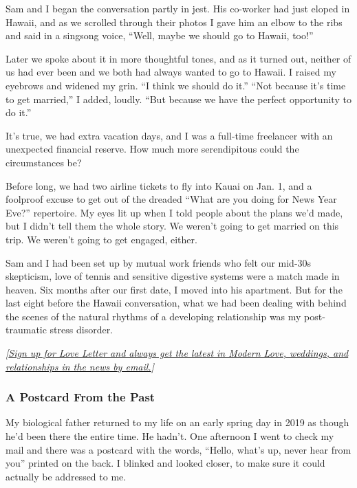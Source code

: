 Sam and I began the conversation partly in jest. His co-worker had just
eloped in Hawaii, and as we scrolled through their photos I gave him an
elbow to the ribs and said in a singsong voice, ``Well, maybe we should
go to Hawaii, too!''

Later we spoke about it in more thoughtful tones, and as it turned out,
neither of us had ever been and we both had always wanted to go to
Hawaii. I raised my eyebrows and widened my grin. ``I think we should do
it.'' ``Not because it's time to get married,'' I added, loudly. ``But
because we have the perfect opportunity to do it.''

It's true, we had extra vacation days, and I was a full-time freelancer
with an unexpected financial reserve. How much more serendipitous could
the circumstances be?

Before long, we had two airline tickets to fly into Kauai on Jan. 1, and
a foolproof excuse to get out of the dreaded ``What are you doing for
News Year Eve?'' repertoire. My eyes lit up when I told people about the
plans we'd made, but I didn't tell them the whole story. We weren't
going to get married on this trip. We weren't going to get engaged,
either.

Sam and I had been set up by mutual work friends who felt our mid-30s
skepticism, love of tennis and sensitive digestive systems were a match
made in heaven. Six months after our first date, I moved into his
apartment. But for the last eight before the Hawaii conversation, what
we had been dealing with behind the scenes of the natural rhythms of a
developing relationship was my post-traumatic stress disorder.

\emph{{[}}\href{https://www.nytimes.com/newsletters/love-letter?module=inline}{\emph{Sign
up for Love Letter and always get the latest in Modern Love, weddings,
and relationships in the news by email.}}\emph{{]}}

\hypertarget{a-postcard-from-the-past}{%
\subsubsection{A Postcard From the
Past}\label{a-postcard-from-the-past}}

My biological father returned to my life on an early spring day in 2019
as though he'd been there the entire time. He hadn't. One afternoon I
went to check my mail and there was a postcard with the words, ``Hello,
what's up, never hear from you'' printed on the back. I blinked and
looked closer, to make sure it could actually be addressed to me.

